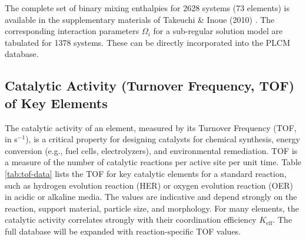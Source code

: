 \documentclass[12pt,a4paper]{article}
\newcommand{\Keff}{K_{\mathrm{eff}}}
\begin{document}
	The complete set of binary mixing enthalpies for 2628 systems (73 elements) is available in the supplementary materials of Takeuchi \& Inoue (2010) \cite{Takeuchi2010}. The corresponding interaction parameters $\Omega_i$ for a sub-regular solution model are tabulated for 1378 systems. These can be directly incorporated into the PLCM database.
	
	\subsection{Catalytic Activity (Turnover Frequency, TOF) of Key Elements}
	\label{subsec:catalytic-activity}
	
	The catalytic activity of an element, measured by its Turnover Frequency (TOF, in s\(^{-1}\)), is a critical property for designing catalysts for chemical synthesis, energy conversion (e.g., fuel cells, electrolyzers), and environmental remediation. TOF is a measure of the number of catalytic reactions per active site per unit time. Table \ref{tab:tof-data} lists the TOF for key catalytic elements for a standard reaction, such as hydrogen evolution reaction (HER) or oxygen evolution reaction (OER) in acidic or alkaline media. The values are indicative and depend strongly on the reaction, support material, particle size, and morphology. For many elements, the catalytic activity correlates strongly with their coordination efficiency \(\Keff\). The full database will be expanded with reaction-specific TOF values.
	
\end{document}
